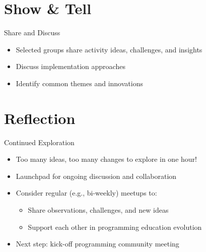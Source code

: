 \documentclass[xcolor=dvipsnames, aspectratio=169]{beamer}
\begin{document}
\section{Show \& Tell}

\begin{frame}{Share and Discuss}
  \begin{itemize}
    \item Selected groups share activity ideas, challenges, and insights
    \item Discuss implementation approaches
    \item Identify common themes and innovations
  \end{itemize}
\end{frame}

\section{Reflection}

\begin{frame}{Continued Exploration}
  \begin{itemize}
    \item Too many ideas, too many changes to explore in one hour!
    \item Launchpad for ongoing discussion and collaboration
    \item Consider regular (e.g., bi-weekly) meetups to:
      \begin{itemize}
        \item Share observations, challenges, and new ideas
        \item Support each other in programming education evolution
      \end{itemize}
    \item Next step: kick-off programming community meeting
  \end{itemize}
\end{frame}
\end{document}
